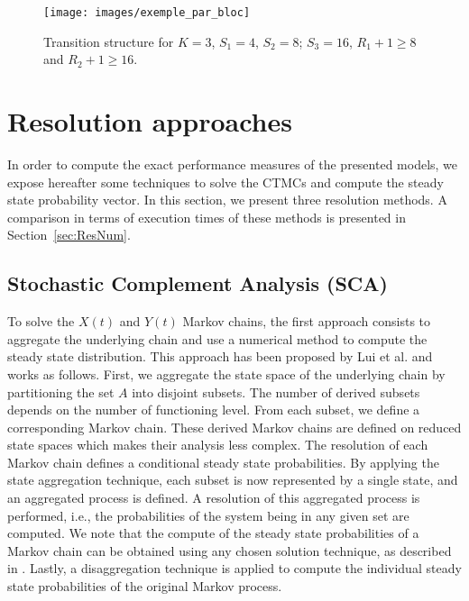 \documentclass[conference]{IEEEtran}
\begin{document}
\begin{figure}[hbtp]
\centering
\texttt{[image: images/exemple\_par\_bloc]}
\caption{Transition structure for $K=3$, $S_1=4$, $S_2=8$; $S_3=16$, $R_1+1 \geq 8$ and $R_2+1 \geq 16$.}
  \label{fig:image-chap4-exemple_par_bloc}
\end{figure}



\section{Resolution approaches} %
\label{sec:ResModel}
In order to compute the exact performance measures of the presented models, we  expose hereafter some techniques to solve the CTMCs and compute the steady state probability vector. In this section, we present three resolution methods. A comparison in terms of execution times of these methods is presented in Section~\ref{sec:ResNum}.

\subsection{Stochastic Complement Analysis (SCA)} %

\label{sec:SCA}
To solve the $X(t)$ and $Y(t)$ Markov chains, the first approach consists to aggregate the underlying chain and use a numerical method to compute the steady state distribution. This approach has been proposed by Lui et al.  \cite{lui1999stochastic}
and works as follows. First, we aggregate the state space of the underlying chain by partitioning the set $A$ into disjoint subsets. The number of derived subsets depends on the number of functioning level. From each subset, we define a corresponding Markov chain. These derived Markov chains are defined on reduced state spaces which makes their analysis less complex. The resolution of each Markov chain defines a conditional steady state probabilities.
By applying the state aggregation technique, each subset is now represented by a single state, and an aggregated process is defined. A resolution of this aggregated process is performed, i.e., the probabilities of the system being in any given set are computed. We note that the compute of the steady state probabilities of a Markov chain can be obtained using any chosen solution technique, as described in \cite{Stew95}.
Lastly, a disaggregation technique is applied to compute the individual steady state probabilities of the original Markov process.
\end{document}
